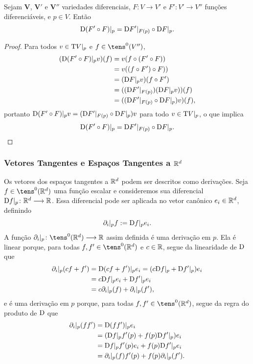 \begin{prop}
Sejam $\bm V$, $\bm V'$ e $\bm V''$ variedades diferenciais, $F\colon V \to V'$ e $F'\colon V' \to V''$ funções diferenciáveis, e $p \in V$. Então
	\begin{equation*}
	\mathrm{D}(F' \circ F)|_{p} = \mathrm{D} F'|_{F(p)} \circ \mathrm{D} F|_{p}.
	\end{equation*}
\end{prop}
\begin{proof}
Para todos $v \in \mathrm{T} V|_p$ e $f \in \tens^0(V'')$,
	\begin{align*}
	(\mathrm{D}(F' \circ F)|_{p} v)(f) &= v(f \circ (F' \circ F)) \\
		&= v((f \circ F') \circ F)) \\
		&= (\mathrm{D} F|_p v)(f \circ F') \\
		&= ((\mathrm{D} F'|_{F(p)})(\mathrm{D} F|_{p} v))(f) \\
		&= ((\mathrm{D} F'|_{F(p)} \circ \mathrm{D} F|_{p}) v)(f),
	\end{align*}
portanto $\mathrm{D}(F' \circ F)|_{p}v = (\mathrm{D} F'|_{F(p)} \circ \mathrm{D} F|_{p})v$ para todo $v \in \mathrm{T} V|_p$, o que implica
	\begin{equation*}
	\mathrm{D}(F' \circ F)|_{p} = \mathrm{D} F'|_{F(p)} \circ \mathrm{D} F|_{p}. \qedhere
	\end{equation*}
\end{proof}

\subsubsection{Vetores Tangentes e Espaços Tangentes a $\mathbb{R}^d$}

Os vetores dos espaços tangentes a $\mathbb{R}^d$ podem ser descritos como derivações. Seja $f \in \tens^0(\R^d)$ uma função escalar e consideremos sua diferencial $\mathrm{D} f|_p\colon \mathbb{R}^d \longrightarrow \mathbb{R}$. Essa diferencial pode ser aplicada no vetor canônico $e_i \in \mathbb{R}^d$, definindo
	\begin{equation*}
	\partial_i|_p f := \mathrm{D} f|_p e_i.
	\end{equation*}
A função $\partial_i|_p\colon \tens^0(\R^d) \to \R$ assim definida é uma derivação em $p$. Ela é linear porque, para todas $f,f' \in \tens^0(\R^d)$ e $c \in \mathbb{R}$, segue da linearidade de $\mathrm{D}$ que
	\begin{align*}
	\partial_i|_p(cf+f') &= \mathrm{D}(cf+f')|_p e_i = (c\mathrm{D} f|_p + \mathrm{D} f'|_p) e_i \\
		&= c\mathrm{D} f|_pe_i + \mathrm{D} f'|_p e_i \\
		&= c\partial_i|_p(f) + \partial_i|_p(f'),
	\end{align*}
e é uma derivação em $p$ porque, para todas $f,f' \in \tens^0(\R^d)$, segue da regra do produto de $\mathrm{D}$ que
	\begin{align*}
	\partial_i|_p (ff') &= \mathrm{D} (ff')|_p e_i \\
		&= (\mathrm{D} f|_p f'(p) + f(p) \mathrm{D} f'|_p) e_i \\
		&= \mathrm{D} f|_p f'(p)e_i + f(p) \mathrm{D} f'|_p e_i \\
		&= \partial_i|_p(f) f'(p) + f(p)\partial_i|_p(f').
	\end{align*}

